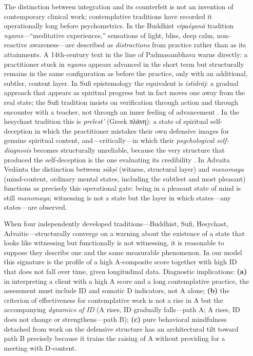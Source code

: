The distinction between integration and its counterfeit is not an invention of contemporary clinical work; contemplative traditions have recorded it operationally long before psychometrics. In the Buddhist \emph{vipa\'{s}yan\=a} tradition \textit{nyams}---``meditative experiences,'' sensations of light, bliss, deep calm, non-reactive awareness---are described as \emph{distractions} from practice rather than as its attainments. A 14th-century text in the line of Padmasambhava \citep{kamalashila1996} warns directly: a practitioner stuck in \textit{nyams} appears advanced in the short term but structurally remains in the same configuration as before the practice, only with an additional, subtler, content layer. In Sufi epistemology the equivalent is \textit{istidr\=aj}: a gradual approach that appears as spiritual progress but in fact moves one away from the real state; the Sufi tradition insists on verification through action and through encounter with a teacher, not through an inner feeling of advancement \citep{schimmel1975}. In the hesychast tradition this is \textit{prelest'} (Greek \textgreek{πλάνη}): a state of spiritual self-deception in which the practitioner mistakes their own defensive images for genuine spiritual content, and---critically---in which their \emph{psychological self-diagnosis} becomes structurally unreliable, because the very structure that produced the self-deception is the one evaluating its credibility \citep{florovsky1987}. In Advaita Ved\=anta the distinction between \textit{s\=ak\d{s}\=i} (witness, structural layer) and \textit{manomaya} (mind-content, ordinary mental states, including the subtlest and most pleasant) functions as precisely this operational gate: being in a pleasant state of mind is still \textit{manomaya}; witnessing is not a state but the layer in which states---any states---are observed.

When four independently developed traditions---Buddhist, Sufi, Hesychast, Advaitic---structurally converge on a warning about the existence of a state that looks like witnessing but functionally is not witnessing, it is reasonable to suppose they describe one and the same measurable phenomenon. In our model this signature is the profile of a high A-composite score together with high ID that does not fall over time, given longitudinal data. Diagnostic implications: \textbf{(a)} in interpreting a client with a high A score and a long contemplative practice, the assessment must include ID and somatic D indicators, not A alone; \textbf{(b)} the criterion of effectiveness for contemplative work is not a rise in A but the accompanying \emph{dynamics of ID} (A rises, ID gradually falls---path A; A rises, ID does not change or strengthens---path B); \textbf{(c)} pure behavioral mindfulness detached from work on the defensive structure has an architectural tilt toward path B precisely because it trains the raising of A without providing for a meeting with D-content.

